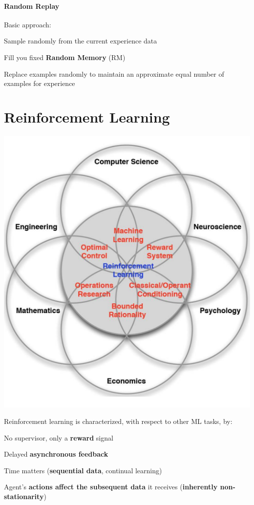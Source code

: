 \documentclass[10pt]{report}
\begin{document}
\paragraph{Random Replay} Basic approach:
\begin{list}{}{}
	\item Sample randomly from the current experience data
	\item Fill you fixed \textbf{Random Memory} (RM)
	\item Replace examples randomly to maintain an approximate equal number of examples for experience
\end{list}
\section{Reinforcement Learning}
\begin{center}
	\includegraphics[scale=0.5]{214.png}
\end{center}
Reinforcement learning is characterized, with respect to other ML tasks, by:
\begin{list}{}{}
	\item No supervisor, only a \textbf{reward} signal
	\item Delayed \textbf{asynchronous feedback}
	\item Time matters (\textbf{sequential data}, continual learning)
	\item Agent's \textbf{actions affect the subsequent data} it receives (\textbf{inherently non-stationarity})
\end{list}
\end{document}
